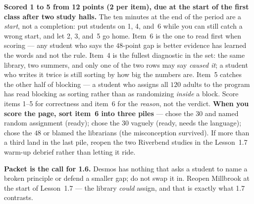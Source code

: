 \documentclass[10pt]{article}
\begin{document}
\begin{teachernote}[Homework]
\textbf{Scored 1 to 5 from 12 points (2 per item), due at the start of the first class after two study
halls.} The ten minutes at the end of the period are a \emph{start}, not a completion: put
students on 1, 4, and~6 while you can still catch a wrong start, and let 2, 3, and~5 go home.
Item~6 is the one to read first when scoring --- any student who says the $48$-point gap is
better evidence has learned the words and not the rule. Item~4 is the fullest diagnostic in
the set: the same library, two summers, and only one of the two rows may say \emph{caused it};
a student who writes it twice is still sorting by how big the numbers are. Item~5 catches the
other half of blocking --- a student who assigns all $120$ adults to the program has read
blocking as sorting rather than as randomizing \emph{inside} a block. Score items 1--5 for
correctness and item~6 for the \emph{reason}, not the verdict. \textbf{When you score the page,
sort item~6 into three piles} --- chose the $30$ and named random assignment (ready); chose the
$30$ vaguely (ready, needs the language); chose the $48$ or blamed the librarians (the
misconception survived). If more than a third land in the last pile, reopen the two Riverbend
studies in the Lesson~1.7 warm-up debrief rather than letting it ride.

\textbf{Packet is the call for 1.6.} Desmos has nothing that asks a student to name a broken
principle or defend a smaller gap; do not swap it in. Reopen Millbrook at the start of
Lesson~1.7 --- the library \emph{could} assign, and that is exactly what 1.7 contrasts.
\end{teachernote}
\end{document}
